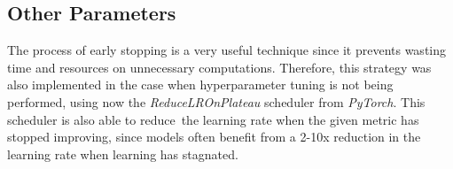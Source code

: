 \subsection{Other Parameters}

The process of early stopping is a very useful technique since it prevents wasting time and resources on unnecessary computations. Therefore, this strategy was also implemented in the case when hyperparameter tuning is not being performed, using now the \textit{ReduceLROnPlateau} scheduler from \textit{PyTorch}. This scheduler is also able to reduce the learning rate when the given metric has stopped improving, since models often benefit from a 2-10x reduction in the learning rate when learning has stagnated.